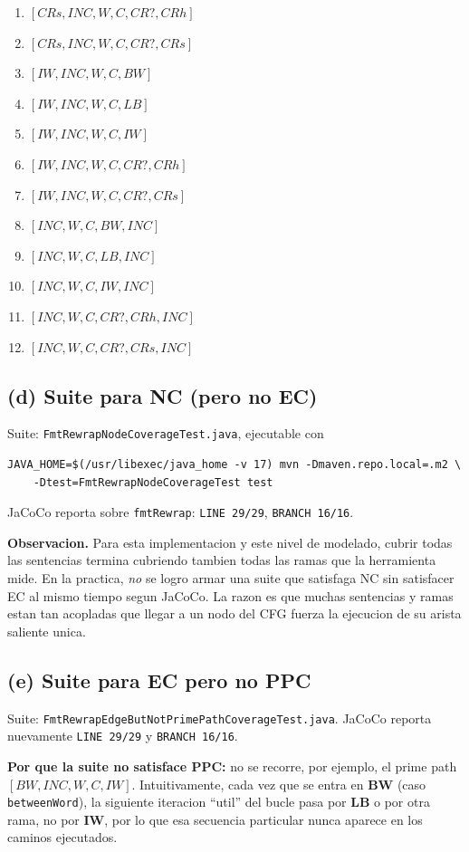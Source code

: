 \documentclass[12pt,a4paper]{article}
\begin{document}
\begin{enumerate}
  \item $[CRs, INC, W, C, CR?, CRh]$
  \item $[CRs, INC, W, C, CR?, CRs]$
  \item $[IW, INC, W, C, BW]$
  \item $[IW, INC, W, C, LB]$
  \item $[IW, INC, W, C, IW]$
  \item $[IW, INC, W, C, CR?, CRh]$
  \item $[IW, INC, W, C, CR?, CRs]$
  \item $[INC, W, C, BW, INC]$
  \item $[INC, W, C, LB, INC]$
  \item $[INC, W, C, IW, INC]$
  \item $[INC, W, C, CR?, CRh, INC]$
  \item $[INC, W, C, CR?, CRs, INC]$
\end{enumerate}

\subsection{(d) Suite para NC (pero no EC)}

Suite: \texttt{FmtRewrapNodeCoverageTest.java}, ejecutable con
\begin{lstlisting}[style=codestyle]
JAVA_HOME=$(/usr/libexec/java_home -v 17) mvn -Dmaven.repo.local=.m2 \
    -Dtest=FmtRewrapNodeCoverageTest test
\end{lstlisting}

JaCoCo reporta sobre \texttt{fmtRewrap}: \texttt{LINE 29/29}, \texttt{BRANCH 16/16}.

\textbf{Observacion.} Para esta implementacion y este nivel de modelado, cubrir todas las
sentencias termina cubriendo tambien todas las ramas que la herramienta mide. En la practica,
\emph{no} se logro armar una suite que satisfaga NC sin satisfacer EC al mismo tiempo segun
JaCoCo. La razon es que muchas sentencias y ramas estan tan acopladas que llegar a un nodo del
CFG fuerza la ejecucion de su arista saliente unica.

\subsection{(e) Suite para EC pero no PPC}

Suite: \texttt{FmtRewrapEdgeButNotPrimePathCoverageTest.java}. JaCoCo reporta nuevamente
\texttt{LINE 29/29} y \texttt{BRANCH 16/16}.

\textbf{Por que la suite no satisface PPC:} no se recorre, por ejemplo, el prime path
$[BW, INC, W, C, IW]$. Intuitivamente, cada vez que se entra en \textbf{BW} (caso
\texttt{betweenWord}), la siguiente iteracion ``util'' del bucle pasa por \textbf{LB} o por otra
rama, no por \textbf{IW}, por lo que esa secuencia particular nunca aparece en los caminos
ejecutados.
\end{document}

